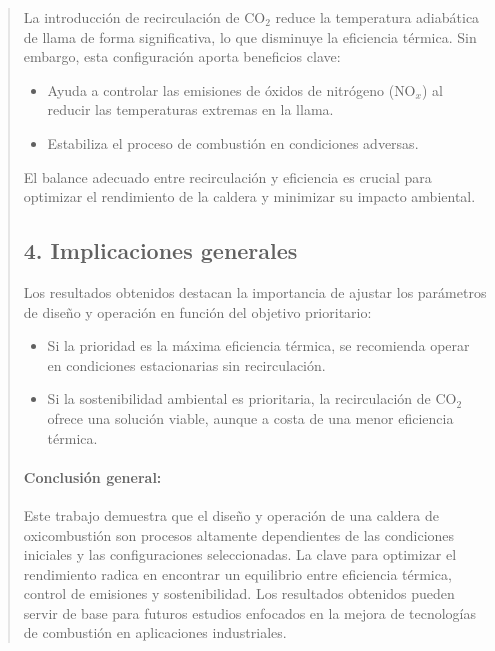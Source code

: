 \documentclass[11pt, a4paper]{article}
\begin{document}
\begin{quote}
\begin{center}
\begin{adjustwidth}{-1.7cm}{-1cm}
La introducción de recirculación de \(\text{CO}_2\) reduce la temperatura adiabática de llama de forma significativa, lo que disminuye la eficiencia térmica. Sin embargo, esta configuración aporta beneficios clave:
\begin{itemize}
    \item Ayuda a controlar las emisiones de óxidos de nitrógeno (\(\text{NO}_x\)) al reducir las temperaturas extremas en la llama.
    \item Estabiliza el proceso de combustión en condiciones adversas.
\end{itemize}
El balance adecuado entre recirculación y eficiencia es crucial para optimizar el rendimiento de la caldera y minimizar su impacto ambiental.

\subsection*{4. Implicaciones generales}

Los resultados obtenidos destacan la importancia de ajustar los parámetros de diseño y operación en función del objetivo prioritario:
\begin{itemize}
    \item Si la prioridad es la máxima eficiencia térmica, se recomienda operar en condiciones estacionarias sin recirculación.
    \item Si la sostenibilidad ambiental es prioritaria, la recirculación de \(\text{CO}_2\) ofrece una solución viable, aunque a costa de una menor eficiencia térmica.
\end{itemize}

\paragraph{Conclusión general:}
Este trabajo demuestra que el diseño y operación de una caldera de oxicombustión son procesos altamente dependientes de las condiciones iniciales y las configuraciones seleccionadas. La clave para optimizar el rendimiento radica en encontrar un equilibrio entre eficiencia térmica, control de emisiones y sostenibilidad. Los resultados obtenidos pueden servir de base para futuros estudios enfocados en la mejora de tecnologías de combustión en aplicaciones industriales.



\newpage

\newpage



\begin{quote}
\setlength{\parskip}{1pt} %
\vspace*{0.3cm} %
\hypertarget{referencias}{%
}
\end{quote}
\end{adjustwidth}
\end{center}
\end{quote}
\end{document}
